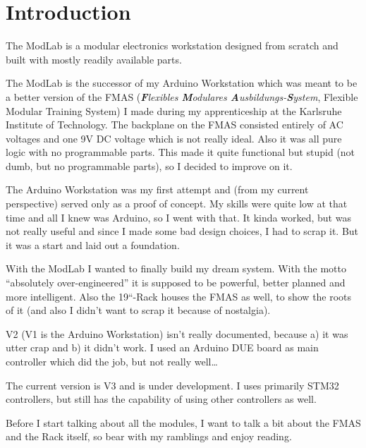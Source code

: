 \chapter{Introduction}

The ModLab is a modular electronics workstation designed from scratch and built with mostly readily available parts. 

The ModLab is the successor of my Arduino Workstation which was meant to be a better version of the FMAS (\textit{\textbf{F}lexibles \textbf{M}odulares \textbf{A}usbildungs-\textbf{S}ystem}, Flexible Modular Training System) I made during my apprenticeship at the Karlsruhe Institute of Technology. The backplane on the FMAS consisted entirely of AC voltages and one 9V DC voltage which is not really ideal. Also it was all pure logic with no programmable parts. This made it quite functional but stupid (not dumb, but no programmable parts), so I decided to improve on it. 

The Arduino Workstation was my first attempt and (from my current perspective) served only as a proof of concept. My skills were quite low at that time and all I knew was Arduino, so I went with that. It kinda worked, but was not really useful and since I made some bad design choices, I had to scrap it. But it was a start and laid out a foundation. 

With the ModLab I wanted to finally build my dream system. With the motto ``absolutely over-engineered'' it is supposed to be powerful, better planned and more intelligent. Also the 19``-Rack houses the FMAS as well, to show the roots of it (and also I didn't want to scrap it because of nostalgia). 

V2 (V1 is the Arduino Workstation) isn't really documented, because a) it was utter crap and b) it didn't work. I used an Arduino DUE board as main controller which did the job, but not really well\dots

The current version is V3 and is under development. I uses primarily STM32 controllers, but still has the capability of using other controllers as well. 

\hspace{1cm}

Before I start talking about all the modules, I want to talk a bit about the FMAS and the Rack itself, so bear with my ramblings and enjoy reading.